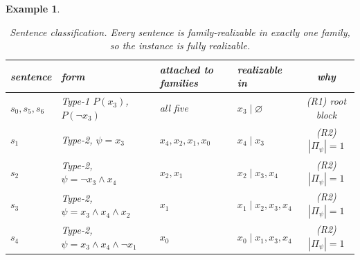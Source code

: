\documentclass{article} %
\newtheorem{example}{Example}
\begin{document}
\begin{example}
\begin{table}[ht]\centering\small
\caption{Sentence classification. Every sentence is
family-realizable in exactly one family, so the instance is fully realizable.}\label{tab:fr5}
\begin{tabular}{@{}llllc@{}}
\toprule
sentence & form & attached to families & realizable in & why \\
\midrule
$s_0,s_5,s_6$ & Type-1 $P(x_3)$, $P(\lnot x_3)$ & all five & $x_3\mid\varnothing$ & (R1) root block \\
$s_1$ & Type-2, $\psi=x_3$            & $x_4,x_2,x_1,x_0$ & $x_4\mid x_3$        & (R2) $|\Pi_\psi|{=}1$ \\
$s_2$ & Type-2, $\psi=\lnot x_3\wedge x_4$ & $x_2,x_1$    & $x_2\mid x_3,x_4$    & (R2) $|\Pi_\psi|{=}1$ \\
$s_3$ & Type-2, $\psi=x_3\wedge x_4\wedge x_2$ & $x_1$     & $x_1\mid x_2,x_3,x_4$& (R2) $|\Pi_\psi|{=}1$ \\
$s_4$ & Type-2, $\psi=x_3\wedge x_4\wedge\lnot x_1$ & $x_0$ & $x_0\mid x_1,x_3,x_4$& (R2) $|\Pi_\psi|{=}1$ \\
\bottomrule
\end{tabular}
\end{table}


\end{example}
\end{document}

